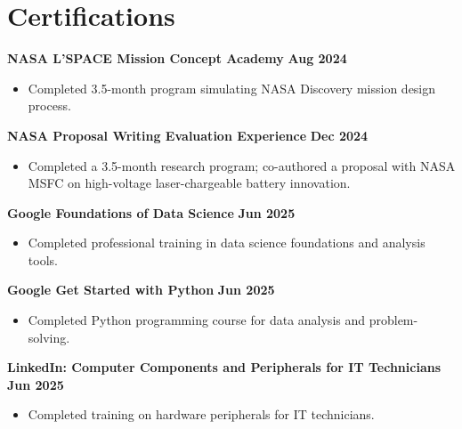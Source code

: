 \documentclass[letterpaper,11pt]{article}
\begin{document}
\section*{Certifications}
\textbf{NASA L'SPACE Mission Concept Academy} \hfill \textbf{Aug 2024}
\begin{itemize}
    \item Completed 3.5-month program simulating NASA Discovery mission design process.
\end{itemize}
\vspace{4mm}
\textbf{NASA Proposal Writing Evaluation Experience} \hfill \textbf{Dec 2024}
\begin{itemize}
    \item Completed a 3.5-month research program; co-authored a proposal with NASA MSFC on high-voltage laser-chargeable battery innovation.
\end{itemize}
\vspace{4mm}
\textbf{Google Foundations of Data Science} \hfill \textbf{Jun 2025}
\begin{itemize}
    \item Completed professional training in data science foundations and analysis tools.
\end{itemize}
\vspace{4mm}
\textbf{Google Get Started with Python} \hfill \textbf{Jun 2025}
\begin{itemize}
    \item Completed Python programming course for data analysis and problem-solving.
\end{itemize}
\vspace{4mm}
\textbf{LinkedIn: Computer Components and Peripherals for IT Technicians} \hfill \textbf{Jun 2025}
\begin{itemize}
    \item Completed training on hardware peripherals for IT technicians.
\end{itemize}
\vspace{4mm}

\fi %
\end{document}
